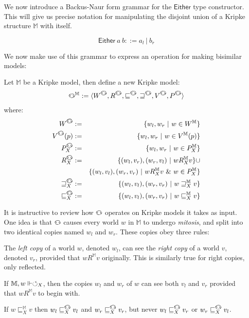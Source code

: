 We now  introduce a Backus-Naur form grammar for the
$\mathsf{Either}$ type constructor. This will give us precise notation
for manipulating the disjoint union of a Kripke structure $\mathbb{M}$
with itself.

\begin{mydef}\label{eitherdef}
\[ \mathsf{Either}\ a\ b ::= a_l \ |\ b_r \]
\end{mydef}

We now make use of this grammar to express an operation for making bisimilar models:

\begin{mydef}[Bisimulator]
Let $\mathbb{M}$ be a Kripke model, then define a new Kripke model:
$$\invis^\mathbb{M} := \langle W^{\invis}, R^{\invis}, \sqsubseteq^{\invis},
\sqsupseteq^{\invis}, V^{\invis}, P^{\invis} \rangle$$ 
where:
 \begin{eqnarray*}
 W^\invis & := &  \{w_l,w_r\ |\ w\in W^{\mathbb{M}} \} \\
 V^\invis(p) & := &  \{w_l,w_r\ |\ w\in V^{\mathbb{M}}(p)\}\\
 P^\invis_X & := &  \{w_l,w_r \ |\  w\in P^\mathbb{M}_X\}\\
 R^\invis_X & := &  \{(w_l,v_r),(w_r,v_l)\ |\ w R^\mathbb{M}_X v \} \cup \\
 & & \{(w_l,v_l), (w_r,v_r) \ |\ w R^\mathbb{M}_X v
\  \&\  w \in P^\mathbb{M}_X\} \\
 \sqsupseteq_X^\invis & := & \{(w_l,v_l),(w_r,v_r)\ | \ 
 w \sqsupseteq^\mathbb{M}_X v \} \\
 \sqsubseteq_X^\invis & := & \{(w_l,v_l),(w_r,v_r)\ | \ 
 w \sqsubseteq^\mathbb{M}_X v \} 
 \end{eqnarray*}
\end{mydef}

It is instructive to review how $\invis$ operates on
Kripke models it takes as input.  
One idea is that $\invis$ causes every world $w$ in
$\mathbb{M}$ to undergo \emph{mitosis}, and split into two identical
copies named $w_l$ and $w_r$.  These copies obey three rules:
\begin{mynum}
\item The \emph{left copy} of a world $w$, denoted $w_l$, can see
  the \emph{right copy} of a world $v$, denoted $v_r$, provided that
  $w R^\mathbb{M} v$ originally.  This is similarly true for right
  copies, only reflected. 
\item If $\mathbb{M}, w \Vdash \circlearrowleft_X$, then the copies $w_l$ and $w_r$
  of $w$ can see both $v_l$ and $v_r$ provided that $w R^\mathbb{M} v$
  to begin with.
\item If $w \sqsubseteq_X^\mathbb{M} v$ then
$w_l \sqsubseteq_X^\invis v_l$ and $w_r \sqsubseteq_X^\invis v_r$, but
never $w_l \sqsubseteq_X^\invis v_r$ or $w_r \sqsubseteq_X^\invis
v_l$.
\end{mynum}

